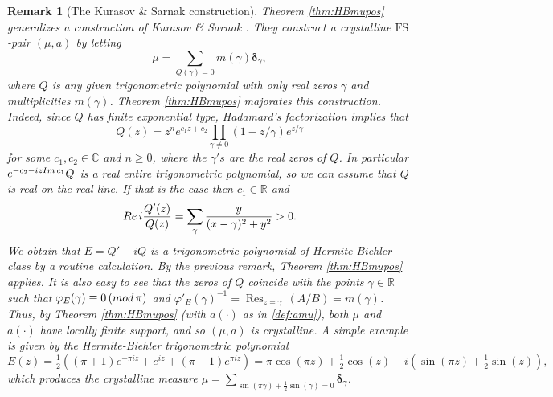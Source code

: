 \documentclass[a4paper,reqno,12pt]{amsart}
\newtheorem{remark}{Remark}
\renewcommand{\r}{\mathbb{R}}
\newcommand{\cp}{\mathbb{C}} %
\newcommand{\bo}{\boldsymbol}
\newcommand{\ga}{\gamma}
\newcommand{\p}{\varphi}
\newcommand{\1}{{\bf 1}}
\newcommand{\fs}{\mathrm{FS}}
\renewcommand{\1}{{\bo 1}}
\newcommand{\del}{{\bo \delta}}
\renewcommand{\Re}{{\rm Re}\,}
\renewcommand{\Im}{{\rm Im}\,}
\newcommand{\res}[1]{ \mathop{\mathrm{Res}}_{z = #1}\,}
\renewcommand{\a}{a(\cdot)}
\begin{document}
\begin{remark}[The  Kurasov \& Sarnak construction] \label{rem:KS}
Theorem \ref{thm:HBmupos} generalizes a construction of Kurasov \& Sarnak \cite{KS}. They construct a crystalline $\fs$-pair $(\mu,a)$ by letting
$$
\mu = \sum_{Q(\ga)=0} m(\ga)\del_\ga,
$$
where $Q$ is any given trigonometric polynomial with only real zeros $\ga$ and multiplicities $m(\ga)$. Theorem \ref{thm:HBmupos} majorates this construction. Indeed, since $Q$ has finite exponential type, Hadamard's factorization implies that 
$$
Q(z)=z^n e^{c_1z+c_2}\prod_{\ga\neq 0} (1-z/\ga)e^{z/\ga}
$$
for some $c_1,c_2\in\cp$ and $n\geq 0$, where the $\ga's$ are the real zeros of $Q$. In particular $e^{-c_2-iz\Im c_1 }Q$ is a real entire trigonometric polynomial, so we can assume that $Q$ is real on the real line. If that is the case then $c_1\in \r$ and
$$
\Re i\frac{Q'(z)}{Q(z)} =\sum_{\ga} \frac{y}{(x-\ga)^2+y^2}>0.
$$
We obtain that $E=Q'-iQ$ is a trigonometric polynomial of Hermite-Biehler class by a routine calculation. By the previous remark, Theorem \ref{thm:HBmupos} applies. It is also easy to see that the zeros of $Q$ coincide with the points $\ga\in\r$ such that $\p_E(\ga)\equiv 0 \,({\rm mod} \, \pi)$ and $\p'_E(\ga)^{-1}= \res{\ga}(A/B)=m(\ga)$. Thus, by Theorem \ref{thm:HBmupos} (with $\a$ as in \eqref{def:amu}), both $\mu$ and $\a$ have locally finite support, and so $(\mu,a)$  is crystalline. A simple example is given by the Hermite-Biehler trigonometric polynomial
$$
E(z)=\tfrac{1}2({(\pi +1)}e^{-\pi i z}+ e^{iz} + {(\pi -1)}e^{\pi i z}) = \pi \cos(\pi z) + \tfrac12 \cos(z) -i(\sin(\pi z)+\tfrac12\sin(z)),
$$
which produces the crystalline measure $\mu=\sum_{\sin(\pi \ga)+\tfrac12\sin(\ga)=0} \del_\ga$.
\end{remark}
\end{document}
